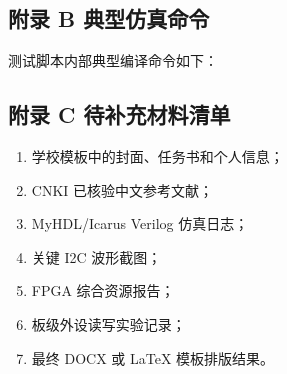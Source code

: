 \subsection{附录 B
典型仿真命令}\label{ux9644ux5f55-b-ux5178ux578bux4effux771fux547dux4ee4}

\begin{Shaded}
\begin{Highlighting}[]
\end{Highlighting}
\end{Shaded}

测试脚本内部典型编译命令如下：

\begin{Shaded}
\begin{Highlighting}[]
 
 
\end{Highlighting}
\end{Shaded}

\subsection{附录 C
待补充材料清单}\label{ux9644ux5f55-c-ux5f85ux8865ux5145ux6750ux6599ux6e05ux5355}

\begin{enumerate}
\def\labelenumi{\arabic{enumi}.}
\tightlist
\item
  学校模板中的封面、任务书和个人信息；
\item
  CNKI 已核验中文参考文献；
\item
  MyHDL/Icarus Verilog 仿真日志；
\item
  关键 I2C 波形截图；
\item
  FPGA 综合资源报告；
\item
  板级外设读写实验记录；
\item
  最终 DOCX 或 LaTeX 模板排版结果。
\end{enumerate}
